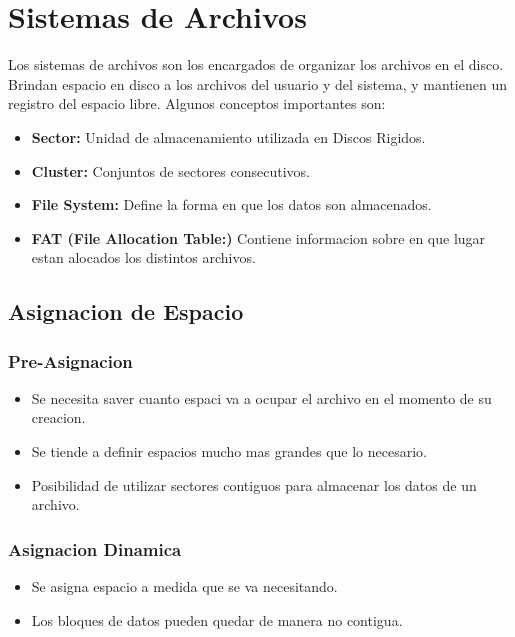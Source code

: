\documentclass[12pt]{article}
\begin{document}
\section{Sistemas de Archivos}
Los sistemas de archivos son los encargados de organizar los archivos en el disco. Brindan espacio en disco a los archivos del usuario y del sistema, y mantienen un registro del espacio libre.
Algunos conceptos importantes son:
\begin{itemize}
    \item \textbf{Sector:} Unidad de almacenamiento utilizada en Discos Rigidos.
    \item \textbf{Cluster:} Conjuntos de sectores consecutivos.
    \item \textbf{File System:} Define la forma en que los datos son almacenados.
    \item \textbf{FAT (File Allocation Table:)} Contiene informacion sobre en que lugar estan alocados los distintos archivos.
\end{itemize}

\subsection{Asignacion de Espacio}

\subsubsection{Pre-Asignacion}
\begin{itemize}
    \item Se necesita saver cuanto espaci va a ocupar el archivo en el momento de su creacion.
    \item Se tiende a definir espacios mucho mas grandes que lo necesario.
    \item Posibilidad de utilizar sectores contiguos para almacenar los datos de un archivo.
\end{itemize}
\subsubsection{Asignacion Dinamica}
\begin{itemize}
    \item Se asigna espacio a medida que se va necesitando.
    \item Los bloques de datos pueden quedar de manera no contigua.
\end{itemize}
\end{document}
